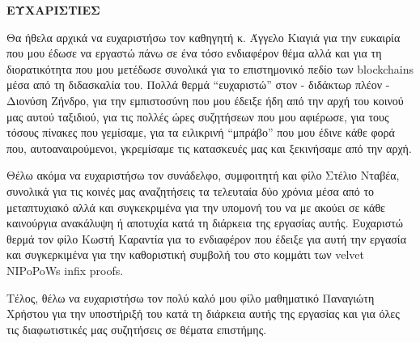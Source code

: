 \newpage
\begin{center}
    \large \textbf{ΕΥΧΑΡΙΣΤΙΕΣ}
\end{center}
Θα ήθελα αρχικά να ευχαριστήσω τον καθηγητή κ. Άγγελο Κιαγιά για την ευκαιρία που μου έδωσε να εργαστώ πάνω σε ένα τόσο ενδιαφέρον θέμα αλλά και για τη διορατικότητα που μου μετέδωσε συνολικά για το επιστημονικό πεδίο των blockchains μέσα από τη διδασκαλία του. Πολλά θερμά ``ευχαριστώ'' στον - διδάκτωρ πλέον - Διονύση Ζήνδρο, για την εμπιστοσύνη που μου έδειξε ήδη από την αρχή του κοινού μας αυτού ταξιδιού, για τις πολλές ώρες συζητήσεων που μου αφιέρωσε, για τους τόσους πίνακες που γεμίσαμε, για τα ειλικρινή ``μπράβο'' που μου έδινε κάθε φορά που, αυτοαναιρούμενοι, γκρεμίσαμε τις κατασκευές μας και ξεκινήσαμε από την αρχή. 

Θέλω ακόμα να ευχαριστήσω τον συνάδελφο, συμφοιτητή και φίλο Στέλιο Νταβέα, συνολικά για τις κοινές μας αναζητήσεις τα τελευταία δύο χρόνια μέσα από το μεταπτυχιακό αλλά και συγκεκριμένα για την υπομονή του να με ακούει σε κάθε καινούργια ανακάλυψη ή αποτυχία κατά τη διάρκεια της εργασίας αυτής. Ευχαριστώ θερμά τον φίλο Κωστή Καραντία για το ενδιαφέρον που έδειξε για αυτή την εργασία και συγκερκιμένα για την καθοριστική συμβολή του στο κομμάτι των velvet NIPoPoWs infix proofs. 

Τέλος, θέλω να ευχαριστήσω τον πολύ καλό μου φίλο μαθηματικό Παναγιώτη Χρήστου για την υποστήριξή του κατά τη διάρκεια αυτής της εργασίας και για όλες τις διαφωτιστικές μας συζητήσεις σε θέματα επιστήμης.
